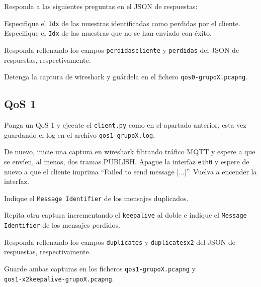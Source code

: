 \documentclass{upmassignment}
\begin{document}
Responda a las siguientes preguntas
en el JSON de respuestas:
\begin{problemlist}
    \pbitem Especifique el \verb|Idx|
        de las muestras identificadas
        como perdidas por el cliente.
    \pbitem Especifique el \verb|Idx|
        de las muestras que no se
        han enviado con éxito.
\end{problemlist}
Responda rellenando los campos
\texttt{perdidascliente} y
\texttt{perdidas} del JSON
de respuestas, respectivamente.

Detenga la captura de wireshark y
guárdela en el fichero
\texttt{qos0-grupoX.pcapng}.


\subsection*{QoS 1}
\noindent
Ponga un QoS 1 y ejecute el \texttt{client.py}
como en el apartado anterior, esta vez
guardando el log en el archivo
\texttt{qos1-grupoX.log}.

De nuevo, inicie una captura en wireshark
filtrando tráfico MQTT y espere a que
se envíen, al menos, dos tramas PUBLISH.
Apague la interfaz \texttt{eth0}
y espere de nuevo a que el cliente
imprima ``Failed to send message [...]''.
Vuelva a encender la interfaz.





\begin{problemlist}
    \setcounter{enumi}{6}
    \pbitem Indique el
        \texttt{Message Identifier}
        de los mensajes duplicados.


    \pbitem Repita otra captura
        incrementando el \texttt{keepalive}
        al doble e indique el
        \texttt{Message Identifier}
        de los mensajes perdidos.

\end{problemlist}
Responda rellenando los campos
\texttt{duplicates} y
\texttt{duplicatesx2} del JSON
de respuestas, respectivamente.

Guarde ambas capturas
en los ficheros
\texttt{qos1-grupoX.pcapng} y\\
\texttt{qos1-x2keepalive-grupoX.pcapng}.
\end{document}
